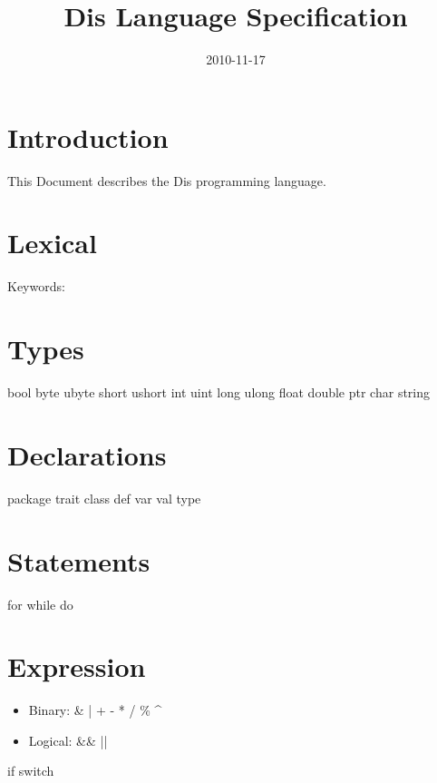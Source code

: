 \documentclass{scrartcl}
\title{Dis Language Specification}
\date{2010-11-17}
\author{}
\begin{document}
\maketitle
\newpage
\tableofcontents
\newpage

\section{Introduction}
This Document describes the Dis programming language. 

\section{Lexical}
Keywords:

\section{Types}
bool byte ubyte short ushort int uint long ulong float double ptr char string

\section{Declarations}
package trait class def var val type

\section{Statements}
for while do

\section{Expression}
\begin{itemize}
\item Binary: \& | + - * / \% \textasciicircum{} 
\item Logical: \&\&  ||
\end{itemize}
if 
switch
\end{document}
